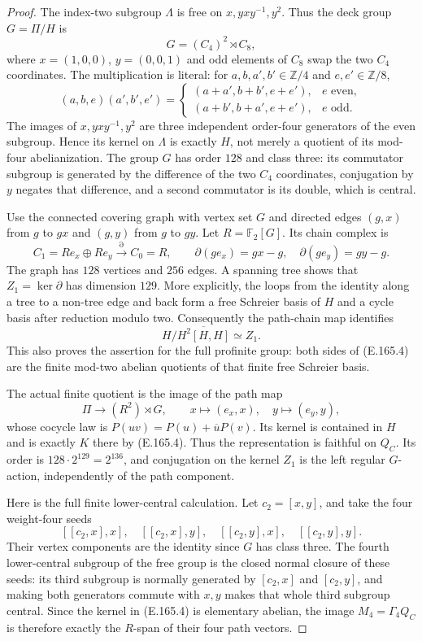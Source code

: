 \begin{proof}
The index-two subgroup $\Lambda$ is free on
$x,yxy^{-1},y^2$.  Thus the deck group $G=\Pi/H$ is
\[
 G=(C_4)^2\rtimes C_8,
\]
where $x=(1,0,0)$, $y=(0,0,1)$ and odd elements of $C_8$
swap the two $C_4$ coordinates.  The multiplication is
literal: for $a,b,a',b'\in\mathbb Z/4$ and
$e,e'\in\mathbb Z/8$,
\[
 (a,b,e)(a',b',e')=
 \begin{cases}
 (a+a',b+b',e+e'),&e\text{ even},\\
 (a+b',b+a',e+e'),&e\text{ odd}.
 \end{cases}
\tag{E.165.2}
\]
The images of $x,yxy^{-1},y^2$ are three independent
order-four generators of the even subgroup.  Hence its
kernel on $\Lambda$ is exactly $H$, not merely a quotient
of its mod-four abelianization.  The group $G$ has order
$128$ and class three: its commutator subgroup is generated
by the difference of the two $C_4$ coordinates, conjugation
by $y$ negates that difference, and a second commutator
is its double, which is central.

Use the connected covering graph with vertex set $G$ and
directed edges $(g,x)$ from $g$ to $gx$ and $(g,y)$ from
$g$ to $gy$.  Let $R=\mathbb F_2[G]$.  Its chain complex is
\[
 C_1=R e_x\oplus R e_y\xrightarrow{\partial} C_0=R,
 \qquad
 \partial(g e_x)=gx-g,\quad\partial(g e_y)=gy-g.
\tag{E.165.3}
\]
The graph has $128$ vertices and $256$ edges.  A spanning
tree shows that $Z_1=\ker\partial$ has dimension $129$.
More explicitly, the loops from the identity along a tree
to a non-tree edge and back form a free Schreier basis of
$H$ and a cycle basis after reduction modulo two.
Consequently the path-chain map identifies
\[
              H/\overline{H^2[H,H]}\simeq Z_1.
\tag{E.165.4}
\]
This also proves the assertion for the full profinite
group: both sides of (E.165.4) are the finite mod-two
abelian quotients of that finite free Schreier basis.

The actual finite quotient is the image of the path map
\[
 \Pi\longrightarrow (R^2)\rtimes G,\qquad
 x\longmapsto(e_x,x),\quad y\longmapsto(e_y,y),
\tag{E.165.5}
\]
whose cocycle law is $P(uv)=P(u)+\overline uP(v)$.
Its kernel is contained in $H$ and is exactly $K$ there
by (E.165.4).  Thus the representation is faithful on
$Q_C$.  Its order is $128\cdot2^{129}=2^{136}$, and
conjugation on the kernel $Z_1$ is the left regular
$G$-action, independently of the path component.

Here is the full finite lower-central calculation.
Let $c_2=[x,y]$, and take the four weight-four seeds
\[
 [[c_2,x],x],\quad [[c_2,x],y],\quad
 [[c_2,y],x],\quad [[c_2,y],y].
\tag{E.165.6}
\]
Their vertex components are the identity since $G$ has
class three.  The fourth lower-central subgroup of the
free group is the closed normal closure of these seeds:
its third subgroup is normally generated by $[c_2,x]$
and $[c_2,y]$, and making both generators commute with
$x,y$ makes that whole third subgroup central.  Since
the kernel in (E.165.4) is elementary abelian, the image
$M_4=\Gamma_4 Q_C$ is therefore exactly the $R$-span of
their four path vectors.


\end{proof}
